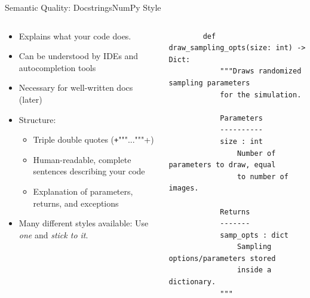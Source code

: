 \begin{splitframe}[fragile]{Semantic Quality: Docstrings}{NumPy Style}
  \begin{columns}[t,onlytextwidth]
    \begin{column}{0.58\textwidth}
      {
      \begin{itemize}
        \setlength{\itemsep}{2.5em}
        \item Explains what your code does.
        \item Can be understood by IDEs and autocompletion tools
        \item Necessary for well-written docs (later)
        \item Structure:
          \begin{itemize}
            \item [\to] Triple double quotes (\texttt+"""..."""+)
            \item Human-readable, complete sentences describing your code
            \item Explanation of parameters, returns, and exceptions
          \end{itemize}
        \item Many different styles available: Use \emph{one} and \emph{stick to it}.
      \end{itemize}
      }
    \end{column}
    \hfill
    \begin{column}{0.38\textwidth}
      \footnotesize
      \vspace*{0.25cm}
      \begin{verbatim}
        def draw_sampling_opts(size: int) -> Dict:
            """Draws randomized sampling parameters
            for the simulation.

            Parameters
            ----------
            size : int
                Number of parameters to draw, equal
                to number of images.

            Returns
            -------
            samp_opts : dict
                Sampling options/parameters stored
                inside a dictionary.
            """
      \end{verbatim}
    \end{column}
  \end{columns}
\end{splitframe}

